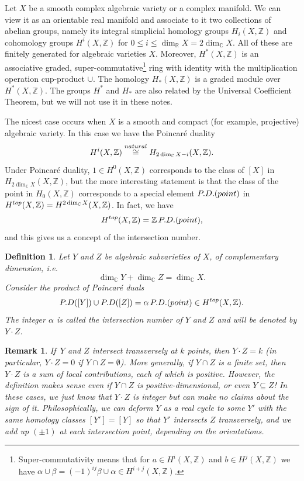 \documentclass[11pt]{article}
\numberwithin{equation}{section}
\numberwithin{footnote}{section}
\newtheorem{defn}[thm]{Definition}
\newtheorem{rem}[thm]{Remark}
\newcommand{\blue}{\color{blue}}
\newcommand{\R}{{\mathbb R}}
\newcommand{\Z}{{\mathbb Z}}
\newcommand{\C}{{\mathbb C}}
\begin{document}
\smallskip
Let $X$ be a smooth complex algebraic variety or a complex manifold. We can view it as an orientable real manifold and associate to it two 
collections of abelian groups, namely its integral simplicial homology groups $H_i(X,\Z)$ and cohomology groups
$
H^{i}(X,\Z)
$
for $0\leq i\leq \dim_\R X = 2\dim_\C X$. 
All of these are finitely generated for algebraic varieties $X$. Moreover, $H^*(X,\Z)$ is an associative graded, super-commutative\footnote{ Super-commutativity means that for $a\in H^i(X,\Z)$ and $b\in H^j(X,\Z)$ we have 
$\alpha\cup \beta = (-1)^{ij}\beta\cup\alpha\in H^{i+j}(X,\Z)$.} ring with identity with the multiplication operation cup-product $\cup$. The homology $H_*(X,\Z)$ is a graded module over $H^*(X,\Z)$.
The groups $H^*$ and $H_*$ are also related by the Universal Coefficient Theorem, but we will not use it in these notes.

\smallskip
The nicest case occurs when $X$ is a smooth and compact (for example, projective) algebraic variety.
In this case we have the Poincar\'e duality
$$
H^i(X,\Z) \stackrel{\rm natural}\cong H_{2\dim_\C X - i}(X,\Z).
$$
Under Poincar\'e duality, $1\in H^0(X,\Z)$ corresponds to the class of $[X]$ in $H_{2\dim_\C X }(X,\Z)$, but the more interesting statement is that the class of the point in $H_0(X,\Z)$ corresponds to a special element ${\rm P.D.(point)}$ in  $H^{\rm top}(X,\Z)=H^{2\dim_\C X}(X,\Z)$. In fact, we have 
$$
H^{\rm top}(X,\Z) = \Z\, {\rm P.D.(point)},
$$
and this gives us a concept of the {\blue intersection number}. 

\smallskip
\begin{defn}
Let $Y$ and $Z$ be algebraic subvarieties of $X$, of complementary dimension, i.e. 
$$
\dim_\C Y+ \dim_\C Z = \dim_\C X.
$$
Consider the product of Poincar\'e duals 
$$
{\rm P.D}([Y]) \cup {\rm P.D}([Z ]) =\alpha\, {\rm P.D.(point)} \in H^{\rm top}(X,\Z).
$$
The integer $\alpha$ is called the intersection number of $Y$ and $Z$ and will be denoted by $Y\cdot Z$.
\end{defn}

\smallskip
\begin{rem}
If $\,Y$ and $Z$ intersect transversely at $k$ points, then $Y\cdot Z = k$ (in particular, $Y\cdot Z=0$ if $Y\cap Z=\emptyset$). More generally, if $Y\cap Z$ is a finite set, then $Y\cdot Z$ is a sum of local contributions, each of which is positive. However, the definition makes sense even if $Y\cap Z$ is positive-dimensional, or even $Y\subseteq Z$! In these cases, we just know that $Y\cdot Z$ is integer but can make no claims about the sign of it. Philosophically, we can deform $Y$ as a real cycle to some $Y'$ with the same homology classes $[Y']=[Y]$ so that $Y'$  intersects $Z$ transversely, and we add up $(\pm 1)$ at each intersection point, depending on the orientations.
\end{rem}
\end{document}
